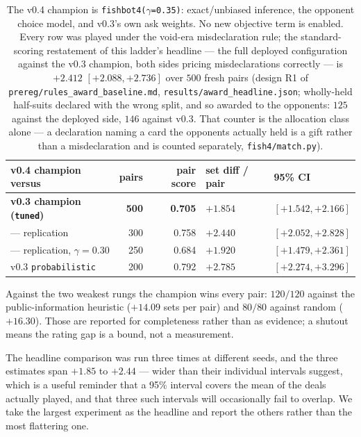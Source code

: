 \documentclass[11pt,a4paper]{article}
\begin{document}
\begin{table}[t]
\centering
\small
\begin{tabular}{lrrll}
\toprule
v0.4 champion versus & pairs & pair score & set diff / pair & 95\% CI \\
\midrule
\textbf{v0.3 champion (\texttt{tuned})} & \textbf{500} & \textbf{0.705} & $\mathbf{+1.854}$ & $\mathbf{[+1.542, +2.166]}$ \\
\quad --- replication & 300 & 0.758 & $+2.440$ & $[+2.052, +2.828]$ \\
\quad --- replication, $\gamma = 0.30$ & 250 & 0.684 & $+1.920$ & $[+1.479, +2.361]$ \\
v0.3 \texttt{probabilistic}    & 200 & 0.792 & $+2.785$ & $[+2.274, +3.296]$ \\
\bottomrule
\end{tabular}
\caption{The v0.4 champion is
\texttt{fishbot4($\gamma$=0.35)}: exact/unbiased inference, the opponent choice
model, and v0.3's own ask weights. No new objective term is enabled. Every
row was played under the void-era misdeclaration rule; the standard-scoring
restatement of this ladder's headline --- the full deployed configuration
against the v0.3 champion, both sides pricing misdeclarations correctly ---
is $+2.412$ $[+2.088, +2.736]$ over $500$ fresh pairs
(design R1 of \texttt{prereg/rules\_award\_baseline.md},
\texttt{results/award\_headline.json}; wholly-held half-suits declared with
the wrong split, and so awarded to the opponents: $125$ against the deployed
side, $146$ against v0.3. That counter is the allocation class alone --- a
declaration naming a card the opponents actually held is a gift rather than a
misdeclaration and is counted separately, \texttt{fish4/match.py}).}
\label{tab:ladder}
\end{table}

Against the two weakest rungs the champion wins every pair: $120/120$ against
the public-information heuristic ($+14.09$ sets per pair) and $80/80$ against
random ($+16.30$). Those are reported for completeness rather than as evidence;
a shutout means the rating gap is a bound, not a measurement.

The headline comparison was run three times at different seeds, and the three
estimates span $+1.85$ to $+2.44$ --- wider than their individual intervals
suggest, which is a useful reminder that a 95\% interval covers the mean of the
deals actually played, and that three such intervals will occasionally fail to
overlap. We take the largest experiment as the headline and report the others
rather than the most flattering one.
\end{document}
